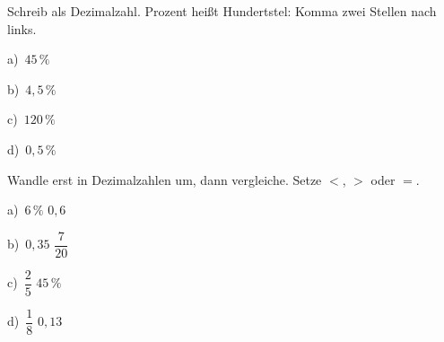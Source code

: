 \documentclass[11pt]{article}
\newcommand{\aufg}[3]{\par\noindent\makebox[0pt][r]{#3}\begin{minipage}[t]{\linewidth}#1\end{minipage}\par}
\newcommand{\nr}[1]{\makebox[7mm][l]{\textbf{#1}}}
\begin{document}
\medskip
\aufg{\nr{C2}\begin{minipage}[t]{\dimexpr\linewidth-7mm\relax}Schreib als Dezimalzahl. Prozent heißt Hundertstel: Komma zwei Stellen nach links.\par\smallskip
\noindent\begin{minipage}[t]{0.48\linewidth}\raggedright
a)\ $45\,\%$
\end{minipage}\hfill
\begin{minipage}[t]{0.48\linewidth}\raggedright
b)\ $4{,}5\,\%$
\end{minipage}\par\smallskip
\noindent\begin{minipage}[t]{0.48\linewidth}\raggedright
c)\ $120\,\%$
\end{minipage}\hfill
\begin{minipage}[t]{0.48\linewidth}\raggedright
d)\ $0{,}5\,\%$
\end{minipage}\par\smallskip\end{minipage}}{}{}
\medskip
\aufg{\nr{C3}\begin{minipage}[t]{\dimexpr\linewidth-7mm\relax}Wandle erst in Dezimalzahlen um, dann vergleiche. Setze $<$, $>$ oder $=$.\par\smallskip
\noindent\begin{minipage}[t]{0.48\linewidth}\raggedright
a)\ $6\,\%$ \fbox{\phantom{$<$}} $0{,}6$
\end{minipage}\hfill
\begin{minipage}[t]{0.48\linewidth}\raggedright
b)\ $0{,}35$ \fbox{\phantom{$<$}} $\dfrac{7}{20}$
\end{minipage}\par\smallskip
\noindent\begin{minipage}[t]{0.48\linewidth}\raggedright
c)\ $\dfrac{2}{5}$ \fbox{\phantom{$<$}} $45\,\%$
\end{minipage}\hfill
\begin{minipage}[t]{0.48\linewidth}\raggedright
d)\ $\dfrac{1}{8}$ \fbox{\phantom{$<$}} $0{,}13$
\end{minipage}\par\smallskip\end{minipage}}{}{{\scriptsize\color{mbgrau}Ziel\hspace{2mm}}}
\medskip
\par\Needspace{25mm}\noindent\colorbox{black!12}{}\hspace{2mm}{\bfseries Quadrat und Wurzel}\par\smallskip
\end{document}
